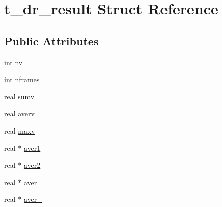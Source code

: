 \hypertarget{structt__dr__result}{\section{t\-\_\-dr\-\_\-result \-Struct \-Reference}
\label{structt__dr__result}
}
\subsection*{\-Public \-Attributes}
\begin{DoxyCompactItemize}
\item 
int \hyperlink{structt__dr__result_a23c6dca12d4b01b26db442aa2dfb4756}{nv}
\item 
int \hyperlink{structt__dr__result_aeb76b6d85904ad5e934747493402d194}{nframes}
\item 
real \hyperlink{structt__dr__result_a0df41a86398264fd8dc860bf07c4f36f}{sumv}
\item 
real \hyperlink{structt__dr__result_aff5d9306dd4ed0be8e7f10e09152ad1b}{averv}
\item 
real \hyperlink{structt__dr__result_a07f7551662a100546fe802b03a774e80}{maxv}
\item 
real $\ast$ \hyperlink{structt__dr__result_ab9659096a1bfd3aa817b2ca72172dcac}{aver1}
\item 
real $\ast$ \hyperlink{structt__dr__result_aa54f5131bc6776d56e3582e09236f334}{aver2}
\item 
real $\ast$ \hyperlink{structt__dr__result_a3f1497892c9ba1af84a4176692a6279b}{aver\-\_}
\item 
real $\ast$ \hyperlink{structt__dr__result_a5273bdeabaf69c0039bbfa5a7fad67a3}{aver\-\_}
\end{DoxyCompactItemize}


